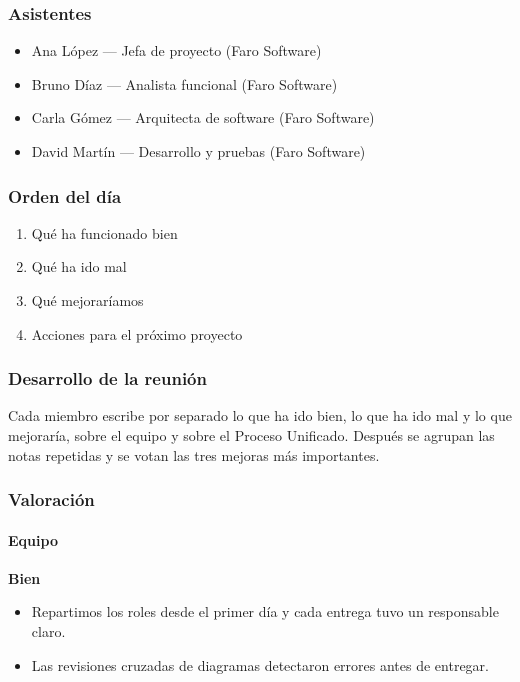 \subsubsection*{Asistentes}

\begin{itemize}
\item Ana López — Jefa de proyecto (Faro Software)
\item Bruno Díaz — Analista funcional (Faro Software)
\item Carla Gómez — Arquitecta de software (Faro Software)
\item David Martín — Desarrollo y pruebas (Faro Software)
\end{itemize}

\subsubsection*{Orden del día}

\begin{enumerate}
\item Qué ha funcionado bien
\item Qué ha ido mal
\item Qué mejoraríamos
\item Acciones para el próximo proyecto
\end{enumerate}

\subsubsection*{Desarrollo de la reunión}

Cada miembro escribe por separado lo que ha ido bien, lo que ha ido mal y lo que mejoraría, sobre el equipo y sobre el Proceso Unificado. Después se agrupan las notas repetidas y se votan las tres mejoras más importantes.

\subsubsection*{Valoración}

\paragraph*{Equipo}

\textbf{Bien}

\begin{itemize}
\item Repartimos los roles desde el primer día y cada entrega tuvo un responsable claro.
\item Las revisiones cruzadas de diagramas detectaron errores antes de entregar.
\end{itemize}

